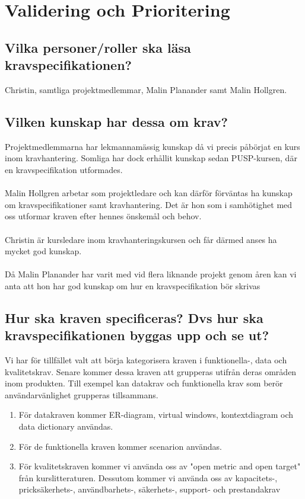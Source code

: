 \documentclass[12pt]{article}
\begin{document}
  

\section{Validering och Prioritering}
\subsection {Vilka personer/roller ska läsa kravspecifikationen?}
Christin, samtliga projektmedlemmar, Malin Planander samt Malin Hollgren.
\subsection{Vilken kunskap har dessa om krav?}
Projektmedlemmarna har lekmannamässig kunskap då vi precis påbörjat en kurs inom kravhantering. Somliga har dock erhållit kunskap sedan PUSP-kursen, där en kravspecifikation utformades.\\\\
Malin Hollgren arbetar som projektledare och kan därför förväntas ha kunskap om kravspecifikationer samt kravhantering. Det är hon som i samhötighet med oss utformar kraven efter hennes önskemål och behov. \\\\
Christin är kursledare inom kravhanteringskursen och får därmed anses ha mycket god kunskap. \\\\
Då Malin Planander har varit med vid flera liknande projekt genom åren kan vi anta att hon har god kunskap om hur en kravspecifikation bör skrivas

\subsection{Hur ska kraven specificeras? Dvs hur ska kravspecifikationen byggas upp och se ut?}
Vi har för tillfället valt att börja kategorisera kraven i funktionella-, data och kvalitetskrav. Senare kommer dessa kraven att grupperas utifrån deras områden inom produkten. Till exempel kan datakrav och funktionella krav som berör användarvänlighet grupperas tillsammans.
\begin{enumerate}
    \item För datakraven kommer ER-diagram, virtual windows, kontextdiagram och data dictionary användas.
    \item För de funktionella kraven kommer scenarion användas.
    \item För kvalitetskraven kommer vi använda oss av "open metric and open target" från kurslitteraturen. Dessutom kommer vi använda oss av kapacitets-, pricksäkerhets-, användbarhets-, säkerhets-, support- och prestandakrav
\end{enumerate}
\end{document}
